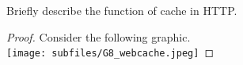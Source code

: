 \documentclass[../main.tex]{subfiles}
\begin{document}
\begin{wts}
    Briefly describe the function of cache in HTTP.
\end{wts}
\begin{proof}
    Consider the following graphic.\\
    \texttt{[image: subfiles/G8\_webcache.jpeg]}


\end{proof}
\end{document}

